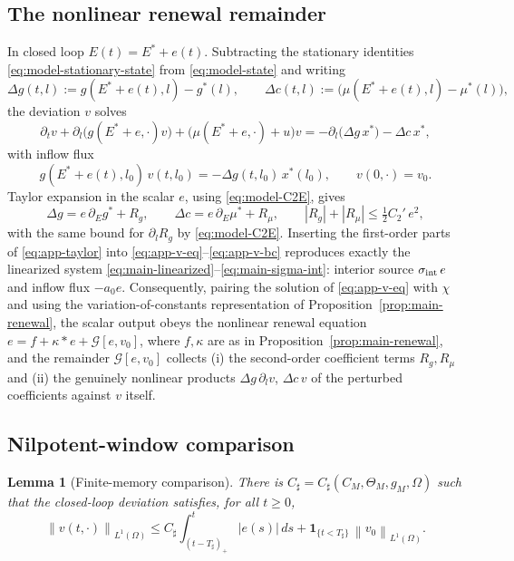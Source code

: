 \documentclass[pdflatex,sn-mathphys-num]{sn-jnl}
\theoremstyle{thmstyleone}
\newtheorem{lemma}[theorem]{Lemma}
\theoremstyle{definition}
\theoremstyle{remark}
\newcommand{\Om}{\Omega}
\newcommand{\Gcal}{\mathcal{G}}
\newcommand{\norm}[1]{\left\lVert#1\right\rVert}
\newcommand{\abs}[1]{\left\lvert#1\right\rvert}
\numberwithin{equation}{section}
\begin{document}
\subsection{The nonlinear renewal remainder}
\label{subsec:app-remainder}

In closed loop $E(t)=E^*+e(t)$. Subtracting the stationary identities
\eqref{eq:model-stationary-state} from \eqref{eq:model-state} and writing
\[
\Delta g(t,l):=g(E^*+e(t),l)-g^*(l),\qquad
\Delta c(t,l):=\big(\mu(E^*+e(t),l)-\mu^*(l)\big),
\]
the deviation $v$ solves
\begin{equation}
\label{eq:app-v-eq}
\partial_t v+\partial_l\big(g(E^*+e,\cdot)v\big)+\big(\mu(E^*+e,\cdot)+u\big)v
=-\partial_l\big(\Delta g\,x^*\big)-\Delta c\,x^*,
\end{equation}
with inflow flux
\begin{equation}
\label{eq:app-v-bc}
g(E^*+e(t),l_0)\,v(t,l_0)=-\Delta g(t,l_0)\,x^*(l_0),
\qquad v(0,\cdot)=v_0 .
\end{equation}
Taylor expansion in the scalar $e$, using \eqref{eq:model-C2E}, gives
\begin{equation}
\label{eq:app-taylor}
\Delta g=e\,\partial_E g^*+R_g,\qquad
\Delta c=e\,\partial_E\mu^*+R_\mu,\qquad
\abs{R_g}+\abs{R_\mu}\le \tfrac12 C_2'\,e^2 ,
\end{equation}
with the same bound for $\partial_l R_g$ by \eqref{eq:model-C2E}. Inserting the
first-order parts of \eqref{eq:app-taylor} into
\eqref{eq:app-v-eq}--\eqref{eq:app-v-bc} reproduces exactly the linearized system
\eqref{eq:main-linearized}--\eqref{eq:main-sigma-int}: interior source
$\sigma_{\rm int}\,e$ and inflow flux $-a_0e$. Consequently, pairing the solution
of \eqref{eq:app-v-eq} with $\chi$ and using the variation-of-constants
representation of Proposition~\ref{prop:main-renewal}, the scalar output obeys the nonlinear renewal equation
$e=f+\kappa*e+\Gcal[e,v_0]$,
where $f,\kappa$ are as in Proposition~\ref{prop:main-renewal}, and the remainder
$\Gcal[e,v_0]$ collects (i) the second-order coefficient terms $R_g,R_\mu$ and
(ii) the genuinely nonlinear products $\Delta g\,\partial_l v$, $\Delta c\,v$ of
the perturbed coefficients against $v$ itself.

\subsection{Nilpotent-window comparison}
\label{subsec:app-window}

\begin{lemma}[Finite-memory comparison]
\label{lem:app-window}
There is $C_\sharp=C_\sharp(C_M,\Theta_M,g_M,\Om)$ such that the closed-loop
deviation satisfies, for all $t\ge0$,
\begin{equation}
\label{eq:app-window}
\norm{v(t,\cdot)}_{L^1(\Om)}
\le
C_\sharp\int_{(t-T_\sharp)_+}^{t}\abs{e(s)}\,ds
+\mathbf 1_{\{t<T_\sharp\}}\,\norm{v_0}_{L^1(\Om)} .
\end{equation}
\end{lemma}
\end{document}
